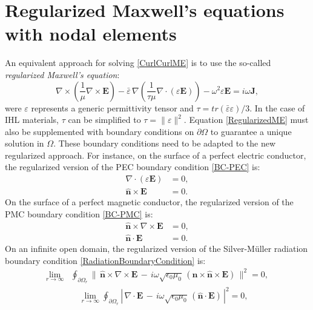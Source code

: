 \section{Regularized Maxwell's equations with nodal elements}\label{RMENodal}

An equivalent approach for solving \eqref{CurlCurlME} is to use the so-called \emph{regularized Maxwell's equation}:
\begin{equation}\label{RegularizedME}
	\nabla\times\left(\frac{1}{\mu}\nabla\times\mathbf{E}\right) - \bar{\varepsilon}\,\nabla\left(\frac{1}{\tau\mu}\nabla\cdot(\varepsilon\mathbf{E})\right) - \omega^{2}\varepsilon\mathbf{E} = i\omega\mathbf{J},
\end{equation}
were $\varepsilon$ represents a generic permittivity tensor and $\tau = tr(\bar{\varepsilon}\varepsilon)/3$. In the case of IHL materials, $\tau$ can be simplified to $\tau = \| \varepsilon \|^{2}$. Equation \ref{RegularizedME} must also be supplemented with boundary conditions on $\partial\Omega$ to guarantee a unique solution in $\Omega$. These boundary conditions need to be adapted to the new regularized approach. For instance, on the surface of a perfect electric conductor, the regularized version of the PEC boundary condition \eqref{BC-PEC} is:
\begin{equation}\label{BC-RPEC}
	\begin{aligned}
		\nabla\cdot(\varepsilon\mathbf{E}) &= 0,
		\\
		\mathbf{\hat{n}}\times\mathbf{E} &= 0.
	\end{aligned}
\end{equation}
On the surface of a perfect magnetic conductor, the regularized version of the PMC boundary condition \eqref{BC-PMC} is:
\begin{equation}\label{BC-RPMC}
	\begin{aligned}
		\mathbf{\hat{n}}\times\nabla\times\mathbf{E} &= 0,
		\\
		\mathbf{\hat{n}}\cdot\mathbf{E} &= 0.
	\end{aligned}
\end{equation}
On an infinite open domain, the regularized version of the Silver-M\"{u}ller radiation boundary condition \eqref{RadiationBoundaryCondition} is: 
\begin{equation}\label{SilverMullerExtend}
	\begin{aligned}
		\lim_{r\rightarrow\infty}&\oint_{\partial\Omega_{r}}\|\,\mathbf{\hat{n}}\times\nabla\times\mathbf{E}\,-\,i\omega\sqrt{\epsilon_{0}\mu_{0}} \, (\mathbf{\hat{n}}\times\mathbf{\hat{n}}\times\mathbf{E})\,\|^{2} =
		0,
		\\
		&\enspace\enspace\lim_{r\rightarrow\infty}\oint_{\partial\Omega_{r}}|\,\nabla\cdot\mathbf{E}\,-\,i\omega\sqrt{\epsilon_{0}\mu_{0}} \, (\mathbf{\hat{n}}\cdot\mathbf{E})\,|^{2} = 0,
	\end{aligned}
\end{equation}
